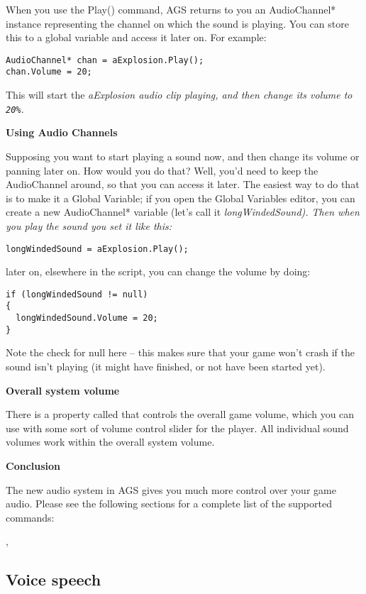 When you use the Play() command, AGS returns to you an AudioChannel* instance representing
the channel on which the sound is playing. You can store this to a global variable and
access it later on. For example:

\begin{verbatim}
AudioChannel* chan = aExplosion.Play();
chan.Volume = 20;
\end{verbatim}

This will start the \it{aExplosion} audio clip playing, and then change its volume to \verb$20%$.

\bf{Using Audio Channels}

Supposing you want to start playing a sound now, and then change its volume or panning later on.
How would you do that? Well, you'd need to keep the AudioChannel around, so that you can access
it later. The easiest way to do that is to make it a Global Variable; if you open the Global Variables
editor, you can create a new AudioChannel* variable (let's call it \it{longWindedSound}). Then when
you play the sound you set it like this:

\verb$longWindedSound = aExplosion.Play();$

later on, elsewhere in the script, you can change the volume by doing:
\begin{verbatim}
if (longWindedSound != null)
{
  longWindedSound.Volume = 20;
}
\end{verbatim}
Note the check for null here -- this makes sure that your game won't crash if the sound isn't
playing (it might have finished, or not have been started yet).

\bf{Overall system volume}

There is a property called  that controls the
overall game volume, which you can use with some sort of volume control slider for the
player. All individual sound volumes work within the overall system volume.

\bf{Conclusion}

The new audio system in AGS gives you much more control over your game audio.
Please see the following sections for a complete list of the supported commands:

,


\subsection{Voice speech}\label{VoiceSpeech}%


